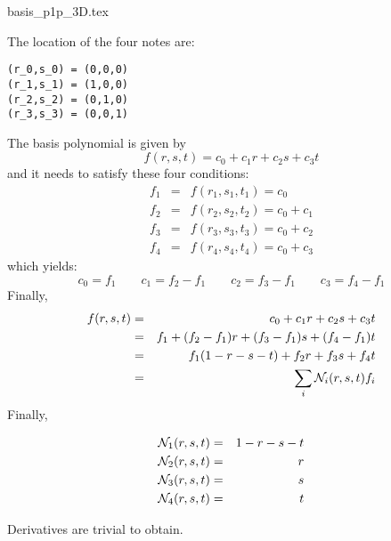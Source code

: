 \begin{flushright} {\tiny {\color{gray} basis\_p1p\_3D.tex}} \end{flushright}

The location of the four notes are:
\begin{verbatim}
(r_0,s_0) = (0,0,0)
(r_1,s_1) = (1,0,0)
(r_2,s_2) = (0,1,0)
(r_3,s_3) = (0,0,1)
\end{verbatim}

The basis polynomial is given by
\[
f(r,s,t)=c_0 + c_1 r + c_2 s + c_3 t
\]
and it needs to satisfy these four conditions:
\begin{eqnarray}
f_1 &=& f(r_1,s_1,t_1) = c_0 \\
f_2 &=& f(r_2,s_2,t_2) = c_0 + c_1\\
f_3 &=& f(r_3,s_3,t_3) = c_0 + c_2\\
f_4 &=& f(r_4,s_4,t_4) = c_0 + c_3
\end{eqnarray}
which yields:
\[
c_0=f_1
\quad
\quad
c_1=f_2-f_1
\quad
\quad
c_2=f_3-f_1
\quad
\quad
c_3=f_4-f_1
\]
Finally,
\begin{eqnarray}
f(r,s,t) 
&=& c_0 + c_1 r + c_2 s + c_3 t \nonumber\\
&=& f_1 + (f_2-f_1) r + (f_3-f_1) s + (f_4-f_1) t \nonumber\\
&=& f_1 (1-r-s-t) + f_2 r + f_3 s + f_4 t \nonumber\\
&=& \sum_i {\mathcal{N}}_i(r,s,t) f_i \nonumber
\end{eqnarray}
Finally,
\begin{mdframed}[backgroundcolor=blue!5]
\begin{eqnarray}
{\mathcal{N}}_1(r,s,t) &=& 1-r-s-t \nonumber\\
{\mathcal{N}}_2(r,s,t) &=& r \nonumber\\
{\mathcal{N}}_3(r,s,t) &=& s \nonumber\\
{\mathcal{N}}_4(r,s,t) &=& t \nonumber
\end{eqnarray}
\end{mdframed}
Derivatives are trivial to obtain.
